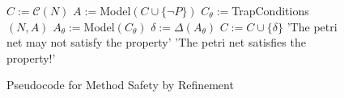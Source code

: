 \begin{figure}
  \begin{algorithmic}[1]
    \State $C := \mathcal C(N)$
    \State $A := $Model$(C \cup \{\neg P\})$
    \State $C_\theta := $TrapConditions$(N, A)$
    \State $A_\theta := $Model$(C_\theta)$
    \State $\delta := \Delta(A_\theta)$
    \State $C := C \cup \{\delta\}$
    \Else
    \State \Return 'The petri net may not satisfy the property'
    \EndIf
    \EndWhile
    \State \Return 'The petri net satisfies the property!'
  \end{algorithmic}
  \caption{Pseudocode for Method Safety by Refinement}
  \label{fig:method-safety-by-refinement-pseudocode}
\end{figure}